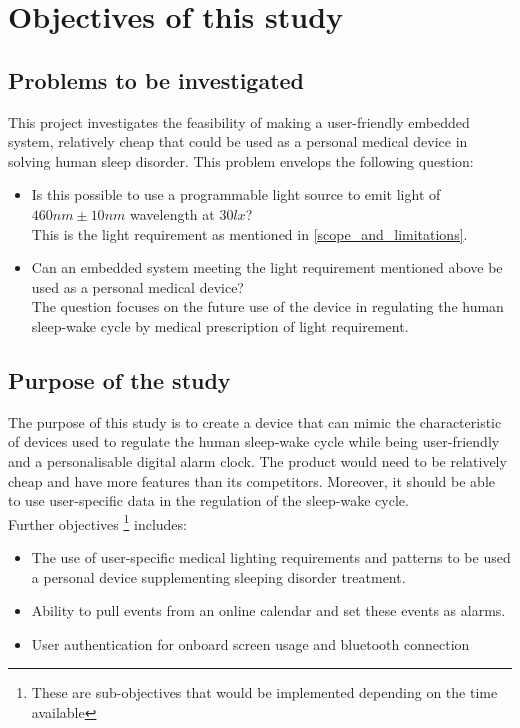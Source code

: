 \section{Objectives of this study}

\subsection{Problems to be investigated}
This project investigates the feasibility of making a user-friendly embedded system, relatively cheap that could be used as a personal medical device in solving human sleep disorder. This problem envelops the following question:
\begin{itemize}
\item[1] Is this possible to use a programmable light source to emit light of $460nm \pm 10nm$ wavelength at $30 lx$?\\
This is the light requirement as mentioned in \cref{scope_and_limitations}.
\item[2] Can an embedded system meeting the light requirement mentioned above be used as a personal medical device?\\
The question focuses on the future use of the device in regulating the human sleep-wake cycle by medical prescription of light requirement.
\end{itemize}

\subsection{Purpose of the study}\label{purpose_of_the_study}
The purpose of this study is to create a device that can mimic the characteristic of devices used to regulate the human sleep-wake cycle while being user-friendly and a personalisable digital alarm clock. The product would need to be relatively cheap and have more features than its competitors. Moreover, it should be able to use user-specific data in the regulation of the sleep-wake cycle.\\
Further objectives \footnote{These are sub-objectives that would be implemented depending on the time available} includes:
\begin{itemize}
\item The use of user-specific medical lighting requirements and patterns to be used a personal device supplementing sleeping disorder treatment.
\item Ability to pull events from an online calendar and set these events as alarms.
\item User authentication for onboard screen usage and bluetooth connection  
\end{itemize} 



